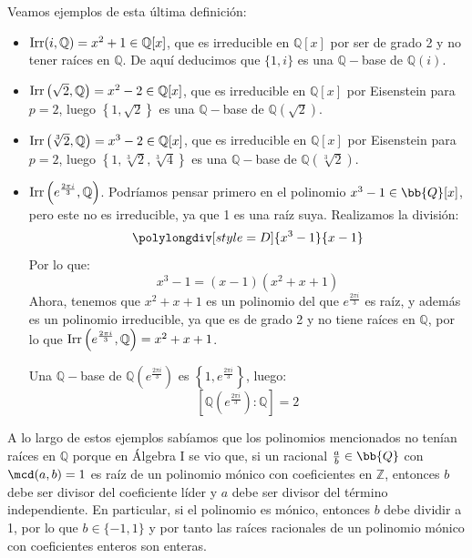 \begin{ejemplo}
    Veamos ejemplos de esta última definición:
    \begin{itemize}
        \item $\operatorname{Irr}(i,\mathbb{Q}) = x^2+1 \in \mathbb{Q}[x]$, que es irreducible en $\mathbb{Q}[x]$  por ser de grado 2 y no tener raíces en $\mathbb{Q}$. De aquí deducimos que $\{1,i\}$ es una $\mathbb{Q}-$base de $\mathbb{Q}(i)$.
        \item $\operatorname{Irr}\left(\sqrt{2}, \mathbb{Q}\right) = x^2-2 \in \mathbb{Q}[x]$, que es irreducible en $\mathbb{Q}[x]$ por Eisenstein para $p=2$, luego $\left\{1,\sqrt{2}\right\}$ es una $\mathbb{Q}-$base de $\mathbb{Q}(\sqrt{2})$.
        \label{ej:baseQsqrt2}
        \item $\operatorname{Irr}\left(\sqrt[3]{2}, \mathbb{Q}\right) = x^3-2 \in \mathbb{Q}[x]$, que es irreducible en $\mathbb{Q}[x]$ por Eisenstein para $p=2$, luego $\left\{1,\sqrt[3]{2},\sqrt[3]{4}\right\}$ es una $\mathbb{Q}-$base de $\mathbb{Q}(\sqrt[3]{2})$.
        \label{ej:baseQsqrt3_2}
        \item $\operatorname{Irr}\left(e^{\frac{2\pi i}{3}}, \mathbb{Q}\right)$. Podríamos pensar primero en el polinomio $x^3-1\in \bb{Q}[x]$, pero este no es irreducible, ya que 1 es una raíz suya. Realizamos la división:
            \begin{equation*}
                \polylongdiv[style=D]{x^3-1}{x-1}
            \end{equation*}
            Por lo que:
            \begin{equation*}
                x^3-1 = (x-1)\left(x^2+x+1\right)
            \end{equation*}
            Ahora, tenemos que $x^2+x+1$ es un polinomio del que $e^{\frac{2\pi i}{3}}$ es raíz, y además es un polinomio irreducible, ya que es de grado 2 y no tiene raíces en $\mathbb{Q}$, por lo que $\operatorname{Irr}\left(e^{\frac{2\pi i}{3}}, \mathbb{Q}\right) = x^2+x+1$.

            Una $\mathbb{Q}-$base de $\mathbb{Q}\left(e^{\frac{2\pi i}{3}}\right)$ es $\left\{1,e^{\frac{2\pi i}{3}}\right\}$, luego:
            \begin{equation*}
                \left[\mathbb{Q}\left(e^{\frac{2\pi i}{3}}\right):\mathbb{Q}\right] = 2
            \end{equation*}
    \end{itemize}
    A lo largo de estos ejemplos sabíamos que los polinomios mencionados no tenían raíces en $\mathbb{Q}$ porque en Álgebra I se vio que, si un racional $\frac{a}{b}\in \bb{Q}$ con $\mcd(a,b)=1$ es raíz de un polinomio mónico con coeficientes en $\mathbb{Z}$, entonces $b$ debe ser divisor del coeficiente líder y $a$ debe ser divisor del término independiente. En particular, si el polinomio es mónico, entonces $b$ debe dividir a 1, por lo que $b\in \{-1,1\}$ y por tanto las raíces racionales de un polinomio mónico con coeficientes enteros son enteras.
\end{ejemplo}

